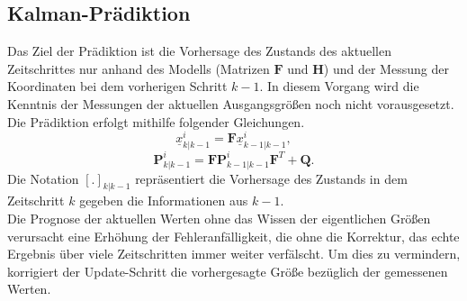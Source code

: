 \documentclass[10pt,a4paper]{article}
\begin{document}
\subsection{Kalman-Prädiktion}

Das Ziel der Prädiktion ist die Vorhersage des Zustands des aktuellen Zeitschrittes nur anhand des Modells (Matrizen $\textbf{F}$ und $\textbf{H}$) und der Messung der Koordinaten bei dem vorherigen Schritt $k-1$. In diesem Vorgang wird die Kenntnis der Messungen der aktuellen Ausgangsgrößen noch nicht vorausgesetzt. Die Prädiktion erfolgt mithilfe folgender Gleichungen.
\begin{equation}
\label{eq:GNNPraediktionX}
\underline{x}^i_{k|k-1} = \textbf{F}\underline{x}^i_{k-1|k-1},
\end{equation} 
\begin{equation}
\label{eq:GNNPraediktionP}
\textbf{P}^i_{k|k-1} = \textbf{F}\textbf{P}^i_{k-1|k-1}\textbf{F}^T + \textbf{Q}.
\end{equation} 
Die Notation ${[.]}_{k|k-1}$ repräsentiert die Vorhersage des Zustands in dem Zeitschritt $k$ gegeben die Informationen aus $k-1$.\\
Die Prognose der aktuellen Werten ohne das Wissen der eigentlichen Größen verursacht eine Erhöhung der Fehleranfälligkeit, die ohne die Korrektur, das echte Ergebnis über viele Zeitschritten immer weiter verfälscht. Um dies zu vermindern, korrigiert der Update-Schritt die vorhergesagte Größe bezüglich der gemessenen Werten.
\end{document}
